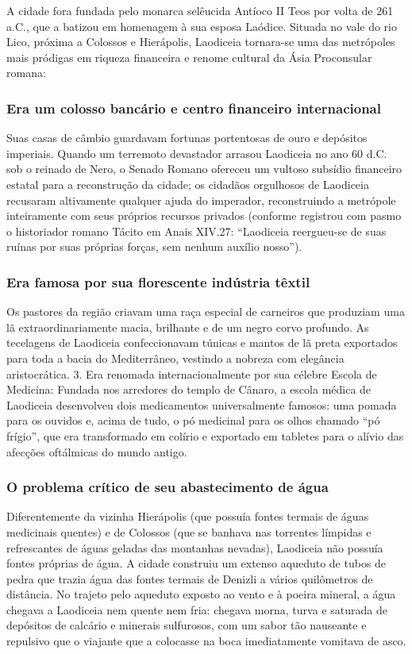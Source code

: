 A cidade fora fundada pelo monarca selêucida Antíoco II Teos por volta de 261 a.C., que a batizou em homenagem à sua esposa Laódice. Situada no vale do rio Lico, próxima a Colossos e Hierápolis, Laodiceia tornara-se uma das metrópoles mais pródigas em riqueza financeira e renome cultural da Ásia Proconsular romana:

\subsubsection*{Era um colosso bancário e centro financeiro internacional}
Suas casas de câmbio guardavam fortunas portentosas de ouro e depósitos imperiais. Quando um terremoto devastador arrasou Laodiceia no ano 60 d.C. sob o reinado de Nero, o Senado Romano ofereceu um vultoso subsídio financeiro estatal para a reconstrução da cidade; os cidadãos orgulhosos de Laodiceia recusaram altivamente qualquer ajuda do imperador, reconstruindo a metrópole inteiramente com seus próprios recursos privados (conforme registrou com pasmo o historiador romano Tácito em Anais XIV.27: ``Laodiceia reergueu-se de suas ruínas por suas próprias forças, sem nenhum auxílio nosso'').

\subsubsection*{Era famosa por sua florescente indústria têxtil}
Os pastores da região criavam uma raça especial de carneiros que produziam uma lã extraordinariamente macia, brilhante e de um negro corvo profundo. As tecelagens de Laodiceia confeccionavam túnicas e mantos de lã preta exportados para toda a bacia do Mediterrâneo, vestindo a nobreza com elegância aristocrática.
3. Era renomada internacionalmente por sua célebre Escola de Medicina: Fundada nos arredores do templo de Cânaro, a escola médica de Laodiceia desenvolveu dois medicamentos universalmente famosos: uma pomada para os ouvidos e, acima de tudo, o pó medicinal para os olhos chamado ``pó frígio'', que era transformado em colírio e exportado em tabletes para o alívio das afecções oftálmicas do mundo antigo.

\subsubsection*{O problema crítico de seu abastecimento de água}
Diferentemente da vizinha Hierápolis (que possuía fontes termais de águas medicinais quentes) e de Colossos (que se banhava nas torrentes límpidas e refrescantes de águas geladas das montanhas nevadas), Laodiceia não possuía fontes próprias de água. A cidade construiu um extenso aqueduto de tubos de pedra que trazia água das fontes termais de Denizli a vários quilômetros de distância. No trajeto pelo aqueduto exposto ao vento e à poeira mineral, a água chegava a Laodiceia nem quente nem fria: chegava morna, turva e saturada de depósitos de calcário e minerais sulfurosos, com um sabor tão nauseante e repulsivo que o viajante que a colocasse na boca imediatamente vomitava de asco.

